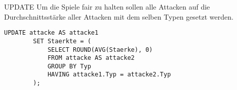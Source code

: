 \begin{example}{UPDATE}
    Um die Spiele fair zu halten sollen alle Attacken auf die Durchschnittsstärke aller Attacken mit dem selben Typen gesetzt werden.

    \exampleseparator

    \begin{lstlisting}[language=mysql]
        UPDATE attacke AS attacke1
        SET Staerkte = (
            SELECT ROUND(AVG(Staerke), 0)
            FROM attacke AS attacke2
            GROUP BY Typ
            HAVING attacke1.Typ = attacke2.Typ 
        );
    \end{lstlisting}
\end{example}